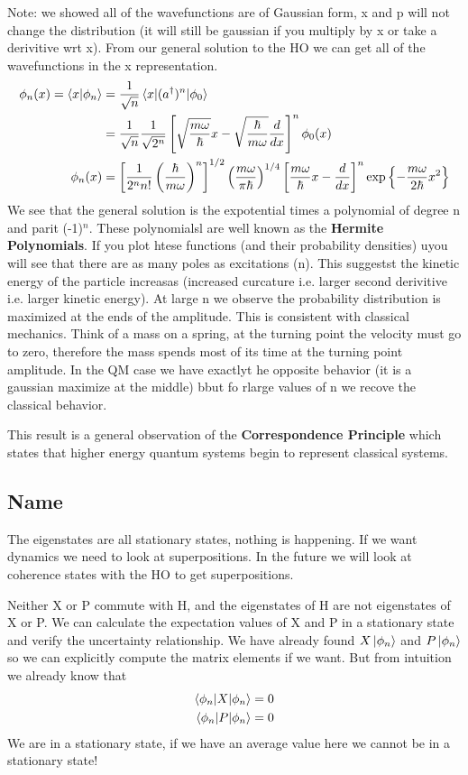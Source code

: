 \documentclass{article}
\newcommand{\be}{\begin{equation}}
\newcommand{\ee}{\end{equation}}
\newcommand{\dg}{\dagger}
\begin{document}
Note: we showed all of the wavefunctions are of Gaussian form, x and p will not change the distribution (it will still be gaussian if you multiply by x or take a derivitive wrt x). 
From our general solution to the HO we can get all of the wavefunctions in the x representation. 
\be
\begin{split}
    \phi_n(x) = \braket{x|\phi_n} &= \frac{1}{\sqrt{n}} \braket{x|(a^\dg)^n|\phi_0}\\
    &= \frac{1}{\sqrt{n}} \frac{1}{\sqrt{2^n}}\left[ \sqrt{\frac{m\omega}{\hbar}}x - \sqrt{\frac{\hbar}{m\omega}}\frac{d}{dx} \right]^n \phi_0(x)\\
    \phi_n(x) &= \left[ \frac{1}{2^nn!} \left(\frac{\hbar}{m\omega}\right)^n \right]^{1/2} \left(\frac{m\omega}{\pi \hbar}\right)^{1/4} \left[ \frac{m\omega}{\hbar}x-\frac{d}{dx} \right]^n \text{exp} \left\{-\frac{m\omega}{2\hbar}x^2\right\}
\end{split}
\ee
We see that the general solution is the expotential times a polynomial of degree n and parit (-1)$^n$.
These polynomialsl are well known as the \textbf{Hermite Polynomials}. 
If you plot htese functions (and their probability densities) uyou will see that there are as many poles as excitations (n).
This suggestst the kinetic energy of the particle increasas (increased curcature i.e. larger second derivitive i.e. larger kinetic energy). 
At large n we observe the probability distribution is maximized at the ends of the amplitude.
This is consistent with classical mechanics.
Think of a mass on a spring, at the turning point the velocity must go to zero, therefore the mass spends most of its time at the turning point amplitude. 
In the QM case we have exactlyt he opposite behavior (it is a gaussian maximize at the middle) bbut fo rlarge values of n we recove the classical behavior. 

This result is a general observation of the \textbf{Correspondence Principle} which states that higher energy quantum systems begin to represent classical systems. 

\subsection*{Name}
The eigenstates are all stationary states, nothing is happening.
If we want dynamics we need to look at superpositions. 
In the future we will look at coherence states with the HO to get superpositions.

Neither X or P commute with H, and the eigenstates of H are not eigenstates of X or P. 
We can calculate the expectation values of X and P in a stationary state and verify the uncertainty relationship.
We have already found $X\ket{\phi_n}$ and $P\ket{\phi_n}$ so we can explicitly compute the matrix elements if we want.
But from intuition we already know that
\be
\begin{split}
    \braket{\phi_n|X|\phi_n} &= 0\\
    \braket{\phi_n|P|\phi_n} &= 0
    \end{split}
    \ee
We are in a stationary state, if we have an average value here we cannot be in a stationary state!
\end{document}
